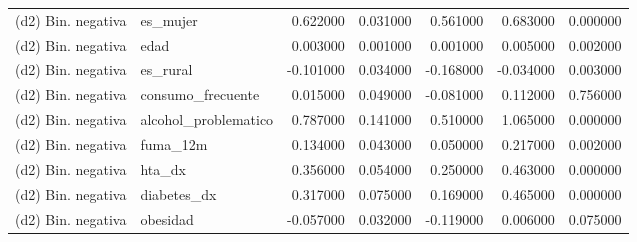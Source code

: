 \begin{longtable}{llrrrrr}
(d2) Bin. negativa & es\_mujer & 0.622000 & 0.031000 & 0.561000 & 0.683000 & 0.000000 \\
(d2) Bin. negativa & edad & 0.003000 & 0.001000 & 0.001000 & 0.005000 & 0.002000 \\
(d2) Bin. negativa & es\_rural & -0.101000 & 0.034000 & -0.168000 & -0.034000 & 0.003000 \\
(d2) Bin. negativa & consumo\_frecuente & 0.015000 & 0.049000 & -0.081000 & 0.112000 & 0.756000 \\
(d2) Bin. negativa & alcohol\_problematico & 0.787000 & 0.141000 & 0.510000 & 1.065000 & 0.000000 \\
(d2) Bin. negativa & fuma\_12m & 0.134000 & 0.043000 & 0.050000 & 0.217000 & 0.002000 \\
(d2) Bin. negativa & hta\_dx & 0.356000 & 0.054000 & 0.250000 & 0.463000 & 0.000000 \\
(d2) Bin. negativa & diabetes\_dx & 0.317000 & 0.075000 & 0.169000 & 0.465000 & 0.000000 \\
(d2) Bin. negativa & obesidad & -0.057000 & 0.032000 & -0.119000 & 0.006000 & 0.075000 \\
\end{longtable}
